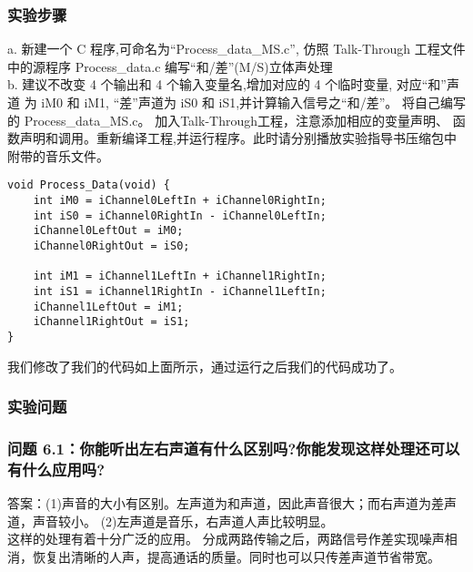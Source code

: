 \documentclass{article}
\begin{document}
\begin{CJK}{UTF8}{gbsn}
\subsubsection{实验步骤}
a. 新建一个 C 程序,可命名为“Process\_data\_MS.c”,
仿照 Talk-Through 工程文件中的源程序 Process\_data.c 编写“和/差”(M/S)立体声处理\\
b. 建议不改变 4 个输出和 4 个输入变量名,增加对应的 4 个临时变量, 对应“和”声道
为 iM0 和 iM1, “差”声道为 iS0 和 iS1,并计算输入信号之“和/差”。
将自己编写的 Process\_data\_MS.c。
加入Talk-Through工程，注意添加相应的变量声明、
函数声明和调用。重新编译工程,并运行程序。此时请分别播放实验指导书压缩包中附带的音乐文件。\\
\begin{lstlisting}
void Process_Data(void) {
	int iM0 = iChannel0LeftIn + iChannel0RightIn;
	int iS0 = iChannel0RightIn - iChannel0LeftIn;
	iChannel0LeftOut = iM0;
	iChannel0RightOut = iS0;
	
	int iM1 = iChannel1LeftIn + iChannel1RightIn;
	int iS1 = iChannel1RightIn - iChannel1LeftIn;
	iChannel1LeftOut = iM1;
	iChannel1RightOut = iS1;
}
\end{lstlisting}
我们修改了我们的代码如上面所示，通过运行之后我们的代码成功了。
\subsubsection{实验问题}
\subsubsection*{问题 6.1：你能听出左右声道有什么区别吗?你能发现这样处理还可以有什么应用吗?}
答案：(1)声音的大小有区别。左声道为和声道，因此声音很大；而右声道为差声道，声音较小。
(2)左声道是音乐，右声道人声比较明显。\\
这样的处理有着十分广泛的应用。
分成两路传输之后，两路信号作差实现噪声相消，恢复出清晰的人声，提高通话的质量。同时也可以只传差声道节省带宽。

\end{CJK}
\end{document}
